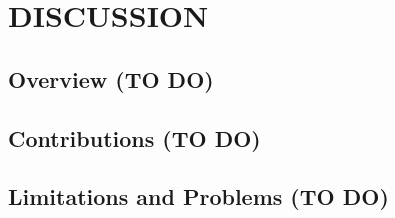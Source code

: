 \chapter{DISCUSSION}
\label{ch:discussion}

\section{Overview (TO DO)}

\section{Contributions (TO DO)}

\section{Limitations and Problems (TO DO)}